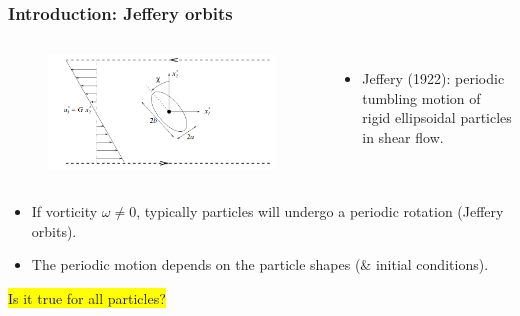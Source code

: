 \documentclass{beamer}
\newcommand{\bi}{\begin{itemize}}
\newcommand{\ei}{\end{itemize}}
\begin{document}
\begin{frame}
	\frametitle{Introduction: Jeffery orbits}
	\begin{overlayarea}{\textwidth}{\textheight}
		\vspace{-0.2cm}
		\begin{columns}
			\begin{figure}[htb]
				\begin{center}
					\includegraphics[width=1\textwidth]{plots/jeffery.png}
				\end{center}
			\end{figure}
			\small
			\bi
			\item Jeffery (1922): periodic tumbling motion of rigid ellipsoidal particles in shear flow.
			\ei 
		\end{columns}
		\vspace{0.5cm}
		\bi 
		\item If \alert{vorticity $\omega\neq 0$}, typically particles will undergo a periodic \alert{rotation} (Jeffery orbits).
		\item The periodic motion depends on the particle shapes ($\&$ initial conditions).
		\ei
		\centering \LARGE \colorbox{yellow}{Is it true for all particles?}
	\end{overlayarea}
\end{frame}

\end{document}
